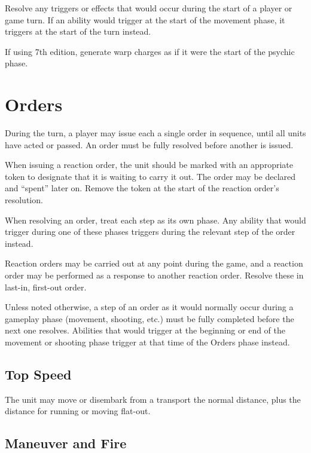 \documentclass[letterpaper,twocolumn,oneside,titlepage]{book}
\begin{document}
Resolve any triggers or effects that would occur during the start of a
player or game turn. If an ability would trigger at the start of the
movement phase, it triggers at the start of the turn instead.

If using 7th edition, generate warp charges as if it were the start of
the psychic phase.

\section{\texorpdfstring{\textbf{Orders}}{Orders}}\label{orders}

During the turn, a player may issue each a single order in sequence,
until all units have acted or passed. An order must be fully resolved
before another is issued.

When issuing a reaction order, the unit should be marked with an
appropriate token to designate that it is waiting to carry it out. The
order may be declared and ``spent'' later on. Remove the token at the
start of the reaction order's resolution.

When resolving an order, treat each step as its own phase. Any ability
that would trigger during one of these phases triggers during the
relevant step of the order instead.

Reaction orders may be carried out at any point during the game, and a
reaction order may be performed as a response to another reaction order.
Resolve these in last-in, first-out order.

Unless noted otherwise, a step of an order as it would normally occur
during a gameplay phase (movement, shooting, etc.) must be fully
completed before the next one resolves. Abilities that would trigger at
the beginning or end of the movement or shooting phase trigger at that
time of the Orders phase instead.

\subsection{\texorpdfstring{\textbf{Top
Speed}}{Top Speed}}\label{top-speed}

The unit may move or disembark from a transport the normal distance,
plus the distance for running or moving flat-out.

\subsection{\texorpdfstring{\textbf{Maneuver and
Fire}}{Maneuver and Fire}}\label{maneuver-and-fire}
\end{document}
